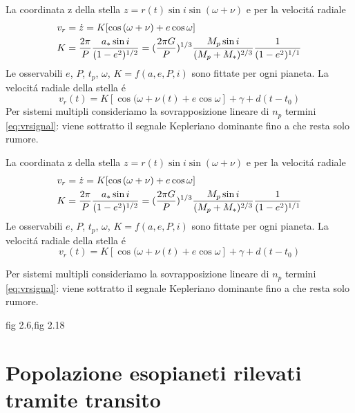 \begin{workout}
La coordinata z della stella $z=r(t)\sin{i}\sin{(\omega+\nu)}$ e per la velocit\'a radiale
\begin{align}
&v_r=\dot{z}=K[\cos{(\omega+\nu)}+e\cos{\omega}]\label{eq:vrsignal}\\
&K=\frac{2\pi}{P}\frac{a_*\sin{i}}{(1-e^2)^{1/2}}=(\frac{2\pi G}{P})^{1/3}\frac{M_p\sin{i}}{(M_p+M_*)^{2/3}}\frac{1}{(1-e^2)^{1/1}}
\end{align}
Le osservabili $e$, $P$, $t_p$, $\omega$, $K=f(a,e,P,i)$ sono fittate per ogni pianeta.
La velocit\'a radiale della stella \'e
\begin{equation}
v_r(t)=K[\cos{(\omega+\nu(t)}+e\cos{\omega}]+\gamma+d(t-t_0)
\end{equation}
Per sistemi multipli consideriamo la sovrapposizione lineare di $n_p$ termini \eqref{eq:vrsignal}: viene sottratto il segnale Kepleriano dominante fino a che resta solo rumore.
\end{workout}

\begin{workout}
La coordinata z della stella $z=r(t)\sin{i}\sin{(\omega+\nu)}$ e per la velocit\'a radiale
\begin{align}
&v_r=\dot{z}=K[\cos{(\omega+\nu)}+e\cos{\omega}]\label{eq:vrsignal}\\
&K=\frac{2\pi}{P}\frac{a_*\sin{i}}{(1-e^2)^{1/2}}=(\frac{2\pi G}{P})^{1/3}\frac{M_p\sin{i}}{(M_p+M_*)^{2/3}}\frac{1}{(1-e^2)^{1/1}}
\end{align}
Le osservabili $e$, $P$, $t_p$, $\omega$, $K=f(a,e,P,i)$ sono fittate per ogni pianeta.
La velocit\'a radiale della stella \'e
\begin{equation}
v_r(t)=K[\cos{(\omega+\nu(t)}+e\cos{\omega}]+\gamma+d(t-t_0)
\end{equation}
\end{workout}
Per sistemi multipli consideriamo la sovrapposizione lineare di $n_p$ termini \eqref{eq:vrsignal}: viene sottratto il segnale Kepleriano dominante fino a che resta solo rumore.
\begin{workout}
fig 2.6,fig 2.18
\end{workout}


\section{Popolazione esopianeti rilevati tramite transito}

